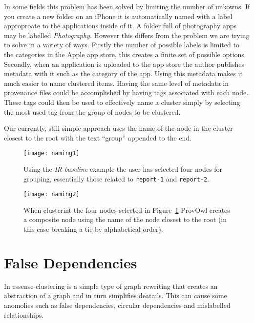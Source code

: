 In some fields this problem has been solved by limiting the number of unkowns. If you create a new folder on an iPhone it is automatically named with a label approproate to the applications inside of it. A folder full of photography apps may be labelled \textit{Photography}. However this differs from the problem we are trying to solve in a variety of ways. Firstly the number of possible labels is limited to the categories in the Apple app store, this creates a finite set of possible options. Secondly, when an application is uploaded to the app store the author publishes metadata with it such as the category of the app. Using this metadata makes it much easier to name clustered items. Having the same level of metadata in provenance files could be accomplished by having tags associated with each node. These tags could then be used to effectively name a cluster simply by selecting the most used tag from the group of nodes to be clustered.

Our currently, still simple approach uses the name of the node in the cluster closest to the root with the text ``group'' appended to the end.

\begin{figure}[h]
	\centering
	\texttt{[image: naming1]}
	\caption{Using the \textit{IR-baseline} example the user has selected four nodes for grouping, essentially those related to \texttt{report-1} and \texttt{report-2}.}
	\label{fig:naming1}
\end{figure}
\begin{figure}[h]
	\centering
	\texttt{[image: naming2]}
	\caption{When clusterint the four nodes selected in Figure~\ref{fig:naming1} ProvOwl creates a composite node using the name of the node closest to the root (in this case breaking a tie by alphabetical order).}
	\label{fig:naming2}
\end{figure}
\clearpage

\section{False Dependencies}
\label{sec:section_name}

In essense clustering is a simple type of graph rewriting that creates an abstraction of a graph and in turn simplifies deatails. This can cause some anomolies such as false dependencies, circular dependencies and mislabelled relationships. 

